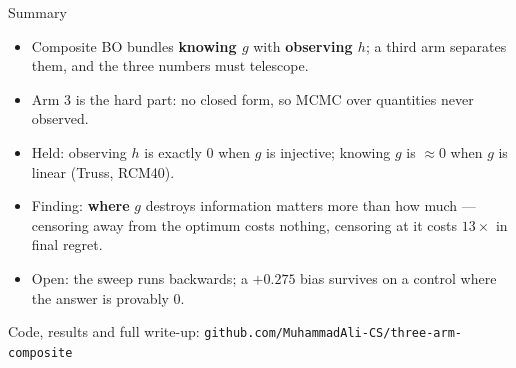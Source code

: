 \documentclass[aspectratio=169,11pt]{beamer}
\newcommand{\good}{\textcolor{green!50!black}}
\newcommand{\bad}{\textcolor{red!70!black}}
\begin{document}
\begin{frame}{Summary}

\begin{itemize}
\item Composite BO bundles \textbf{knowing $g$} with \textbf{observing $h$};
a third arm separates them, and the three numbers must telescope.
\item Arm 3 is the hard part: no closed form, so MCMC over quantities never
observed.
\item \good{Held}: observing $h$ is exactly 0 when $g$ is injective; knowing $g$
is $\approx 0$ when $g$ is linear (Truss, RCM40).
\item \good{Finding}: \textbf{where} $g$ destroys information matters more than
how much --- censoring away from the optimum costs nothing, censoring at it
costs $13\times$ in final regret.
\item \bad{Open}: the sweep runs backwards; a $+0.275$ bias survives on a
control where the answer is provably 0.
\end{itemize}

\vfill
\centering
\small Code, results and full write-up:
\texttt{github.com/MuhammadAli-CS/three-arm-composite}

\end{frame}
\end{document}
